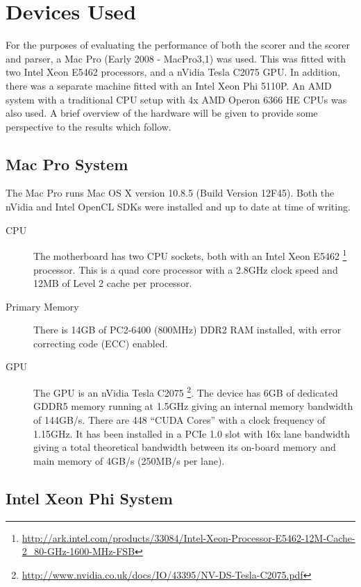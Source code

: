\section{Devices Used}

For the purposes of evaluating the performance of both the scorer and the scorer
and parser, a Mac Pro (Early 2008 - MacPro3,1) was used. This was fitted with
two Intel Xeon E5462 processors, and a nVidia Tesla C2075 GPU. In addition,
there was a separate machine fitted with an Intel Xeon Phi 5110P. An AMD system
with a traditional CPU setup with 4x AMD Operon 6366 HE CPUs was also used. A
brief overview of the hardware will be given to provide some perspective to the
results which follow.

\subsection{Mac Pro System}

The Mac Pro runs Mac OS X version 10.8.5 (Build Version 12F45). Both the
nVidia and Intel OpenCL SDKs were installed and up to date at time of writing.

\begin{description}

\item[CPU] The motherboard has two CPU sockets, both with an Intel Xeon E5462
\footnote{\url{http://ark.intel.com/products/33084/Intel-Xeon-Processor-E5462-12M-Cache-2_80-GHz-1600-MHz-FSB}}
processor. This is a quad core processor with a 2.8GHz clock speed and 12MB of
Level 2 cache per processor.

\item[Primary Memory] There is 14GB of PC2-6400 (800MHz) DDR2 RAM installed,
with error correcting code (ECC) enabled.

\item[GPU] The GPU is an nVidia Tesla C2075
\footnote{\url{http://www.nvidia.co.uk/docs/IO/43395/NV-DS-Tesla-C2075.pdf}}.
The device has 6GB of dedicated GDDR5 memory running at 1.5GHz giving an
internal memory bandwidth of 144GB/s. There are 448 ``CUDA Cores'' with a clock
frequency of 1.15GHz. It has been installed in a PCIe 1.0 slot with 16x lane
bandwidth giving a total theoretical bandwidth between its on-board memory and
main memory of 4GB/s (250MB/s per lane).

\end{description}

\subsection{Intel Xeon Phi System}

